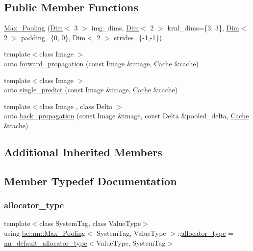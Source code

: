 \subsection*{Public Member Functions}
\begin{DoxyCompactItemize}
\item 
\hyperlink{structbc_1_1nn_1_1Max__Pooling_a69393077da5937894221f44aa7e2b2a8}{Max\+\_\+\+Pooling} (\hyperlink{structbc_1_1Dim}{Dim}$<$ 3 $>$ img\+\_\+dims, \hyperlink{structbc_1_1Dim}{Dim}$<$ 2 $>$ krnl\+\_\+dims=\{3, 3\}, \hyperlink{structbc_1_1Dim}{Dim}$<$ 2 $>$ padding=\{0, 0\}, \hyperlink{structbc_1_1Dim}{Dim}$<$ 2 $>$ strides=\{-\/1,-\/1\})
\item 
{\footnotesize template$<$class Image $>$ }\\auto \hyperlink{structbc_1_1nn_1_1Max__Pooling_adb17cec0e6f91755e663c42b74d2ad29}{forward\+\_\+propagation} (const Image \&image, \hyperlink{structbc_1_1nn_1_1Cache}{Cache} \&cache)
\item 
{\footnotesize template$<$class Image $>$ }\\auto \hyperlink{structbc_1_1nn_1_1Max__Pooling_af6cbfd7b406742ea3ae1028497eedd5f}{single\+\_\+predict} (const Image \&image, \hyperlink{structbc_1_1nn_1_1Cache}{Cache} \&cache)
\item 
{\footnotesize template$<$class Image , class Delta $>$ }\\auto \hyperlink{structbc_1_1nn_1_1Max__Pooling_a77c095e97891545afd2a9d8ade1dc2a3}{back\+\_\+propagation} (const Image \&image, const Delta \&pooled\+\_\+delta, \hyperlink{structbc_1_1nn_1_1Cache}{Cache} \&cache)
\end{DoxyCompactItemize}
\subsection*{Additional Inherited Members}


\subsection{Member Typedef Documentation}
\mbox{\label{structbc_1_1nn_1_1Max__Pooling_a7e0efe21cc4544634801342f08b51a04}} 
\subsubsection{\texorpdfstring{allocator\+\_\+type}{allocator\_type}}
{\footnotesize\ttfamily template$<$class System\+Tag, class Value\+Type$>$ \\
using \hyperlink{structbc_1_1nn_1_1Max__Pooling}{bc\+::nn\+::\+Max\+\_\+\+Pooling}$<$ System\+Tag, Value\+Type $>$\+::\hyperlink{structbc_1_1nn_1_1Max__Pooling_a7e0efe21cc4544634801342f08b51a04}{allocator\+\_\+type} =  \hyperlink{namespacebc_1_1nn_a0025752fc3f47f988b3fae106c825860}{nn\+\_\+default\+\_\+allocator\+\_\+type}$<$Value\+Type, System\+Tag$>$}

